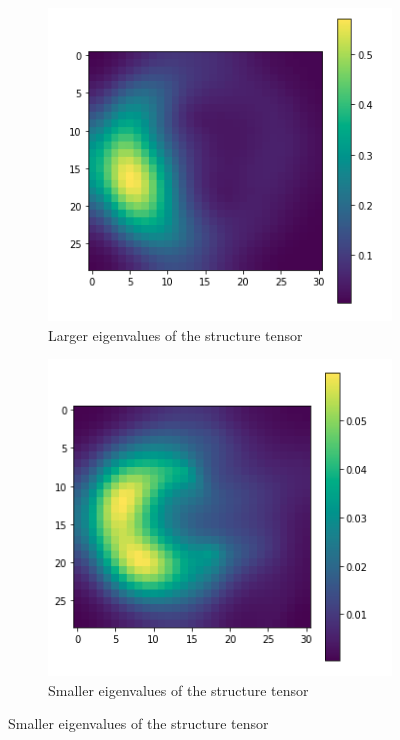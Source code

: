 		\begin{figure}
		
			\begin{subfigure}[t]{.55\textwidth}
				\includegraphics[scale=0.5]{images/larger_ev.png}
				\caption{Larger eigenvalues of the structure tensor}		
				\label{subfig:larger_ev}
			\end{subfigure}
			
			\begin{subfigure}[t]{.55\textwidth}
				\includegraphics[scale=0.5]{images/smaller_ev.png}
				\caption{Smaller eigenvalues of the structure tensor }
				\label{subfig:smaller_ev}
			\end{subfigure}
			

\end{figure}
